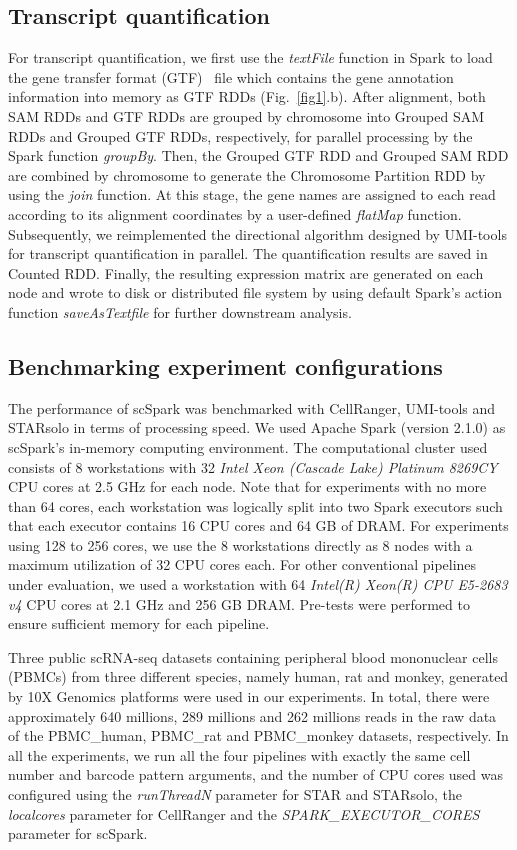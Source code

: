 \documentclass[conference]{IEEEtran}
\begin{document}
\subsection{Transcript quantification}
For transcript quantification, we first use the \textit{textFile} function in Spark to load the gene transfer format (GTF)~\cite{breese2013ngsutils} file which contains the gene annotation information into memory as GTF RDDs (Fig.~\ref{fig1}.b). 
After alignment, both SAM RDDs and GTF RDDs are grouped by chromosome into Grouped SAM RDDs and Grouped GTF RDDs, respectively, for parallel processing by the Spark function \textit{groupBy}. 
Then, the Grouped GTF RDD and Grouped SAM RDD are combined by chromosome to generate the Chromosome Partition RDD by using the \textit{join} function.
At this stage, the gene names are assigned to each read according to its alignment coordinates by a user-defined \textit{flatMap} function. 
Subsequently, we reimplemented the directional algorithm designed by UMI-tools for transcript quantification in parallel. The quantification results are saved in Counted RDD.
Finally, the resulting expression matrix are generated on each node and wrote to disk or distributed file system by using default Spark's action function \textit{saveAsTextfile} for further downstream analysis. 

\subsection{Benchmarking experiment configurations}
The performance of scSpark was benchmarked with CellRanger, UMI-tools and STARsolo in terms of processing speed. 
We used Apache Spark (version 2.1.0) as scSpark's in-memory computing environment.
The computational cluster used consists of 8 workstations with 32 \textit{Intel Xeon (Cascade Lake) Platinum 8269CY} CPU cores at 2.5 GHz for each node. 
Note that for experiments with no more than 64 cores, each workstation was logically split into two Spark executors such that each executor contains 16 CPU cores and 64 GB of DRAM. 
For experiments using 128 to 256 cores, we use the 8 workstations directly as 8 nodes with a maximum utilization of 32 CPU cores each. 
For other conventional pipelines under evaluation, we used a workstation with 64 \textit{Intel(R) Xeon(R) CPU E5-2683 v4} CPU cores at 2.1 GHz and 256 GB DRAM. Pre-tests were performed to ensure sufficient memory for each pipeline.

Three public scRNA-seq datasets containing peripheral blood mononuclear cells (PBMCs) from three different species, namely human, rat and monkey, generated by 10X Genomics platforms were used in our experiments. 
In total, there were approximately 640 millions, 289 millions and 262 millions reads in the raw data of the PBMC\_human, PBMC\_rat and PBMC\_monkey datasets, respectively. 
In all the experiments, we run all the four pipelines with exactly the same cell number and barcode pattern arguments, and the number of CPU cores used was configured using the \textit{runThreadN} parameter for STAR and STARsolo, the \textit{localcores} parameter for CellRanger and the \textit{SPARK\_EXECUTOR\_CORES} parameter for scSpark.
\end{document}
